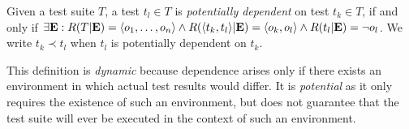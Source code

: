 

\begin{definition} \label{def:dependency}
Given a test suite\/ $T$,
a test\/ $t_l \in T$ is \emph{potentially dependent} on test\/ $t_k
\in T$, if and only if\/
$\exists \mathbf{E} : R(T|\mathbf{E}) =  \langle o_1,\dots, o_n \rangle  \wedge
R( \langle t_k,t_l \rangle |\mathbf{E}) =  \langle o_k, o_l \rangle  \wedge
R(t_l|\mathbf{E}) = \neg o_l$.
We write\/ $t_k \prec t_l$ when\/ $t_l$ is potentially dependent on\/ $t_k$.
\end{definition}


This definition is \emph{dynamic} because dependence arises only
if there exists an environment in which actual test results would differ.
It is \emph{potential} as it only requires the existence of such an
environment, but does not
guarantee that the test suite will ever be executed in the context
of such an environment.



